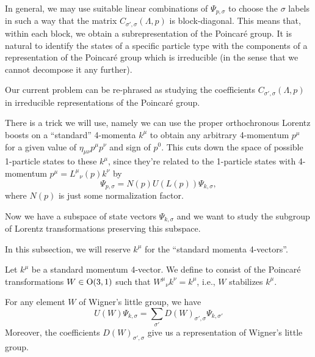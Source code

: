 In general, we may use suitable linear combinations of $\Psi_{p,\sigma}$
to choose the $\sigma$ labels in such a way that the matrix
$C_{\sigma',\sigma}(\Lambda,p)$ is block-diagonal. This means that,
within each block, we obtain a subrepresentation of the Poincar\'e group.
It is natural to identify the states of a specific particle type with
the components of a representation of the Poincar\'e group which is
irreducible (in the sense that we cannot decompose it any further).

\begin{problem}
Our current problem can be re-phrased as studying the coefficients
$C_{\sigma',\sigma}(\Lambda,p)$ in irreducible representations of the
Poincar\'e group.
\end{problem}

There is a trick we will use, namely we can use the proper orthochronous Lorentz
boosts on a ``standard'' 4-momenta $k^{\mu}$ to obtain any arbitrary
4-momentum $p^{\mu}$ for a given value of $\eta_{\mu\nu}p^{\mu}p^{\nu}$
and sign of $p^{0}$. This cuts down the space of possible 1-particle
states to these $k^{\mu}$, since they're related to the 1-particle
states with 4-momentum $p^{\mu} = {L^{\mu}}_{\nu}(p)k^{\nu}$ by
\begin{equation}
\Psi_{p,\sigma} = N(p)U(L(p))\Psi_{k,\sigma},
\end{equation}
where $N(p)$ is just some normalization factor.

Now we have a subspace of state vectors $\Psi_{k,\sigma}$ and we want to
study the subgroup of Lorentz transformations preserving this subspace.

In this subsection, we will reserve $k^{\mu}$ for the ``standard momenta 4-vectors''.

\begin{definition}
Let $k^{\mu}$ be a standard momentum 4-vector. We define
to consist of the Poincar\'e transformations
$W\in\mathrm{O}(3,1)$ such that ${W^{\mu}}_{\nu}k^{\nu}=k^{\mu}$, i.e., $W$
stabilizes $k^{\mu}$.
\end{definition}

\begin{theorem}
  For any element $W$ of Wigner's little group, we have
  \begin{equation}
U(W)\Psi_{k,\sigma} = \sum_{\sigma'}D(W)_{\sigma',\sigma}\Psi_{k,\sigma'}
  \end{equation}
  Moreover, the coefficients $D(W)_{\sigma',\sigma}$ give us a
  representation of Wigner's little group.
\end{theorem}


